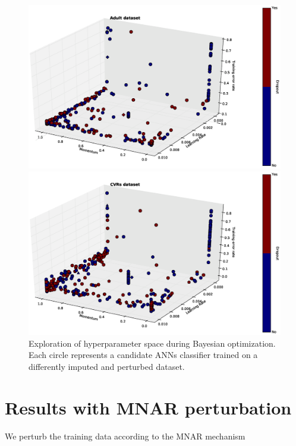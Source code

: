 \documentclass[10pt]{book}
\theoremstyle{definition}
\begin{document}
\begin{figure}[h!]
\includegraphics [scale=0.4, center, center]{figure/params3d_adult.eps}\par
\includegraphics [scale=0.4, center, center]{figure/params3d_votes.eps}\par
\caption{\footnotesize Exploration of hyperparameter space during Bayesian optimization. Each circle represents a candidate ANNs classifier trained on a differently imputed and perturbed dataset.}
   \label{fig:params}
\end{figure}

\clearpage
\section{Results with MNAR perturbation}
\setcounter{equation}{0}

We perturb the training data according to the MNAR mechanism
 
\end{document}
